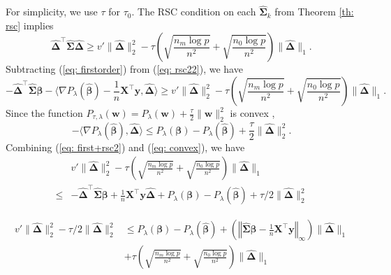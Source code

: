 \documentclass[twoside,12pt]{article}
\newcommand{\mb}[1]{\boldsymbol{\mathbf{#1}}}
\newcommand{\wh}[1]{\widehat{#1}}
\begin{document}
For simplicity, we use $\tau$ for $\tau_0$.
The RSC condition on each $\wh{\mb\Sigma}_k$ from Theorem \ref{th: rsc} implies 
\begin{equation}
	\label{eq: rsc22}
	\wh{\mb\Delta}^\top\wh{\mb\Sigma}\wh{\mb\Delta}\geq v'\|\wh{\boldsymbol{\Delta}}\|_{2}^{2}-\tau \left(\sqrt{\frac{n_m\log p}{n^2}}+\sqrt{\frac{n_0\log p}{n^2}}\right)\|\wh{\boldsymbol{\Delta}}\|_{1}.
\end{equation}
Subtracting (\ref{eq: firstorder}) from (\ref{eq: rsc22}), we have
\begin{equation}
	\label{eq: first+rsc2}
	-\wh{\mb\Delta}^\top\wh{\mb\Sigma}{\mb\beta}-\langle\nabla P_{\lambda}(\wh{\mb\beta})-\frac1n\mb X^\top\mb y, \wh{\mb\Delta}\rangle\geq v'\|\wh{\boldsymbol{\Delta}}\|_{2}^{2}-\tau \left(\sqrt{\frac{n_m\log p}{n^2}}+\sqrt{\frac{n_0\log p}{n^2}}\right)\|\wh{\boldsymbol{\Delta}}\|_{1}.
\end{equation}
Since the function $P_{\tau, \lambda}(\mb w)=P_{\lambda}(\mb w)+\frac{\tau}2 \|\mb w\|_2^2$ is convex \citep{Loh2015, liu2022multiple},
\begin{equation}
	\label{eq: convex}
	-\langle\nabla P_{\lambda}(\wh{\mb\beta}), \wh{\mb\Delta}\rangle\leq P_{\lambda}(\mb\beta)-P_{\lambda}(\wh{\mb\beta})+\frac{\tau}2 \|\wh{\mb\Delta}\|_2^2.
\end{equation}
Combining (\ref{eq: first+rsc2}) and (\ref{eq: convex}), we have
\begin{equation*}
	\begin{aligned}
		&v'\|\wh{\boldsymbol{\Delta}}\|_{2}^{2}-\tau \left(\sqrt{\frac{n_m\log p}{n^2}}+\sqrt{\frac{n_0\log p}{n^2}}\right)\|\wh{\boldsymbol{\Delta}}\|_{1}\\
		\leq& -\wh{\mb\Delta}^\top \wh{\mb\Sigma}\mb\beta+\frac1n \mb X^\top\mb y \wh{\mb\Delta}+P_{\lambda}(\mb\beta)-P_{\lambda}(\wh{\mb\beta})+\tau/2\| \wh{\mb\Delta}\|_2^2
	\end{aligned}
\end{equation*}

\begin{equation*}
	\begin{aligned}
		v'\|\wh{\mb\Delta}\|_2^2-\tau/2\| \wh{\mb\Delta}\|_2^2&\leq P_{\lambda}(\mb\beta)-P_{\lambda}(\wh{\mb\beta})+\left(\left\Vert\wh{\mb\Sigma}\mb\beta-\frac1n \mb X^\top\mb y\right\Vert_{\infty}\right)\| \wh{\mb\Delta}\|_1\\
		&+\tau \left(\sqrt{\frac{n_m\log p}{n^2}}+\sqrt{\frac{n_0\log p}{n^2}}\right)\|\wh{\mb\Delta}\|_1
	\end{aligned}
\end{equation*}
\end{document}
